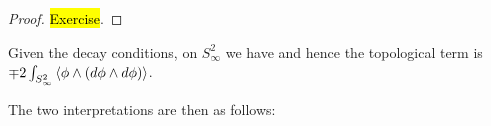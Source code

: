 \documentclass{article}
\begin{document}
\begin{proof}
	\hl{Exercise}. 
\end{proof}
\begin{corollary}
	Given the decay conditions, on $S_\infty^2$ we have 
	and hence the topological term is $\mp 2\int_{S_\infty^2} \left\langle \phi \wedge (d\phi \wedge d\phi) \right\rangle$.
	\begin{comment}
	Now the inverse stereographic projection $f : \mbb{R}^2 \to S^2 \subset \mbb{R}^{3}$ allows us to pullback the standard metric on $\mbb{R}^{3}$. This can be done in Sage:
	\begin{lstlisting}[language=Python,frame=single]
	sage: M = Manifold(2, 'R^2')
	sage: U.<u,v> = M.chart()
	sage: N = Manifold(3, 'R^3')
	sage: X.<x,y,z> = N.chart()
	sage: f = M.diff_map(N,(2*u/(1+u^2+v^2), 2*v/(1+u^2+v^2),
	(-1+u^2+v^2)/(1+u^2+v^2)))
	sage: g = N.sym_bilin_form_field(name='g')
	sage: g[1,1], g[2,2], g[3,3] = 1, 1, 1
	sage: fg = f.pullback(g)
	sage: f.display()
	4/(u^4 + v^4 + 2*(u^2 + 1)*v^2 + 2*u^2 + 1) du*du 
	+ 4/(u^4 + v^4 + 2*(u^2 + 1)*v^2 + 2*u^2 + 1) dv*dv
	\end{lstlisting}
	\end{comment}
\end{corollary}
The two interpretations are then as follows: 
\end{document}
